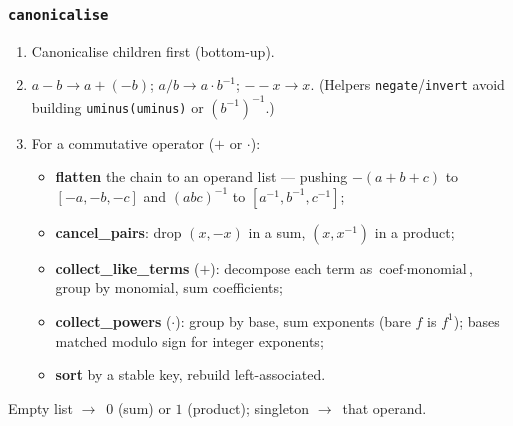 \documentclass[10pt,slidestop]{beamer}
\newcommand{\code}[1]{\texttt{#1}}
\newcommand{\ra}{$\rightarrow$}
\begin{document}
\begin{frame}\frametitle{\texttt{canonicalise}}
  \begin{enumerate}
  \item Canonicalise children first (bottom-up).\newline
  \item $a - b \to a + (-b)$; \; $a / b \to a \cdot b^{-1}$; \; $--x \to x$.
    (Helpers \code{negate}/\code{invert} avoid building
    \code{uminus(uminus)} or $(b^{-1})^{-1}$.)\newline
  \item For a commutative operator ($+$ or $\cdot$):
    \begin{itemize}
    \item[a.] \textbf{flatten} the chain to an operand list --- pushing
      $-(a{+}b{+}c)$ to $[-a,-b,-c]$ and $(abc)^{-1}$ to
      $[a^{-1},b^{-1},c^{-1}]$;
    \item[b.] \textbf{cancel\_pairs}: drop $(x,-x)$ in a sum, $(x,x^{-1})$ in a
      product;
    \item[c.] \textbf{collect\_like\_terms} ($+$): decompose each term as
      $\text{coef}\cdot\text{monomial}$, group by monomial, sum coefficients;
    \item[d.] \textbf{collect\_powers} ($\cdot$): group by base, sum exponents
      (bare $f$ is $f^1$); bases matched modulo sign for integer exponents;
    \item[e.] \textbf{sort} by a stable key, rebuild left-associated.
    \end{itemize}
  \end{enumerate}
  Empty list \ra\ $0$ (sum) or $1$ (product); singleton \ra\ that operand.
\end{frame}
\end{document}
